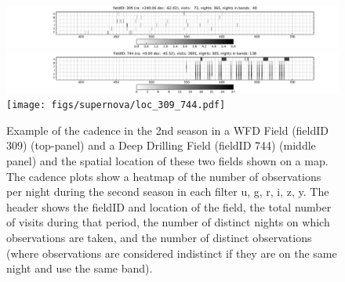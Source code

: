 \begin{figure}
 \centering
 \includegraphics[width=\textwidth]{figs/supernova/fig_309_2ndYear}
 \includegraphics[width=\textwidth]{figs/supernova/fig_744_2ndYear}
 \texttt{[image: figs/supernova/loc\_309\_744.pdf]}
 \caption{Example of the cadence in the 2nd season in a WFD Field
 (fieldID 309) (top-panel) and a Deep Drilling Field (fieldID 744)
 (middle panel) and the spatial location of these two fields shown on a
 map. The cadence plots show a heatmap of the number of observations per
 night during the second season in each filter u, g, r, i, z, y.
 The header shows the fieldID and location of
 the field, the total number of visits during that period, the number of
 distinct nights on which observations are taken, and the number of
 distinct observations (where observations are considered indistinct
 if they are on the same night and use the same band).}
  \label{fig:SN_sampling}
\end{figure}


